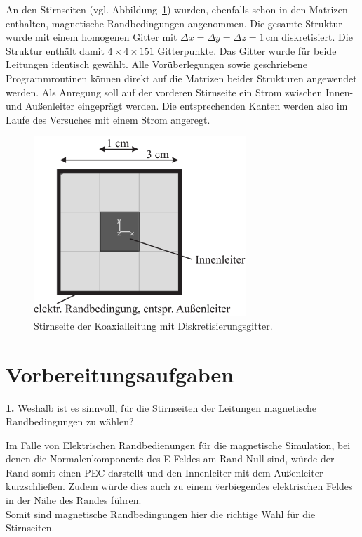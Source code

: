 \documentclass[Protokollheft.tex]{subfiles}
\begin{document}
    An den Stirnseiten (vgl. Abbildung~\ref{b3}) wurden, ebenfalls schon in den Matrizen
    enthalten, magnetische Randbedingungen angenommen. Die gesamte
    Struktur wurde mit einem homogenen Gitter mit $\Delta x = \Delta y
    = \Delta z = 1\,\text{cm}$ diskretisiert. Die Struktur enthält damit $4
    \times 4 \times 151$ Gitterpunkte.
    Das Gitter wurde für beide Leitungen identisch gewählt. Alle
    Vorüberlegungen sowie geschriebene Programmroutinen können direkt
    auf die Matrizen beider Strukturen angewendet werden. Als Anregung soll auf der vorderen Stirnseite ein Strom zwischen Innen- und Außenleiter eingeprägt werden. Die entsprechenden Kanten werden also im Laufe des Versuches mit einem Strom angeregt.
    \begin{figure}[h]
        \begin{center}
        \includegraphics[width=8cm]{v7_mesh.pdf}
        \caption{Stirnseite der Koaxialleitung mit Diskretisierungsgitter.}\label{b3}
        \end{center}
    \end{figure}
    \newpage

\section{Vorbereitungsaufgaben}

\begin{framed}
	\noindent \textbf{1.} Weshalb ist es sinnvoll, für die Stirnseiten der Leitungen
magnetische Randbedingungen zu wählen?\label{exer:bound4frontOfLine}
\end{framed}
Im Falle von Elektrischen Randbedienungen für die magnetische Simulation, bei denen die Normalenkomponente des E-Feldes am Rand Null sind, würde der Rand somit einen PEC darstellt und den Innenleiter mit dem Außenleiter kurzschließen. Zudem würde dies auch zu einem \" verbiegen\" des elektrischen Feldes in der Nähe des Randes führen. \\
Somit sind magnetische Randbedingungen hier die richtige Wahl für die Stirnseiten. 
\end{document}
